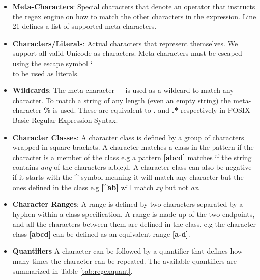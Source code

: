 \begin{itemize}
    \item \textbf{Meta-Characters}: Special characters that denote an operator that instructs the regex engine on how to match the other characters in the expression. Line 21 defines a list of supported meta-characters.
    
    \item \textbf{Characters/Literals}: Actual characters that represent themselves. We support all valid Unicode as characters. Meta-characters must be escaped using the escape symbol \textbf{\char`\\} to be used as literals.
    
    \item \textbf{Wildcards}: The meta-character \textbf{\_} is used as a wildcard to match any character. To match a string of any length (even an empty string) the meta-character \textbf{\%} is used. These are equivalent to \textbf{.} and \textbf{.*} respectively in POSIX Basic Regular Expression Syntax.
    
    \item \textbf{Character Classes}: A character class is defined by a group of characters wrapped in square brackets. A character matches a class in the pattern if the character is a member of the class e.g a pattern \textbf{[abcd]} matches if the string contains \textit{any} of the characters a,b,c,d. A character class can also be negative if it starts with the \textbf{\^{}} symbol meaning it will match any character but the ones defined in the class e.g \textbf{[\^{}ab]} will match \textit{xy} but not \textit{ax}.
    
    \item \textbf{Character Ranges}: A range is defined by two characters separated by a hyphen within a class specification. A range is made up of the two endpoints, and all the characters between them are defined in the class. e.g the character class \textbf{[abcd]} can be defined as an equivalent range \textbf{[a-d]}.
    
    \item \textbf{Quantifiers} A character can be followed by a quantifier that defines how many times the character can be repeated. The available quantifiers are summarized in Table \ref{tab:regexquant}.
    

\newcommand\rownumber{\stepcounter{magicrownumbers}\arabic{magicrownumbers}}


\end{itemize}
